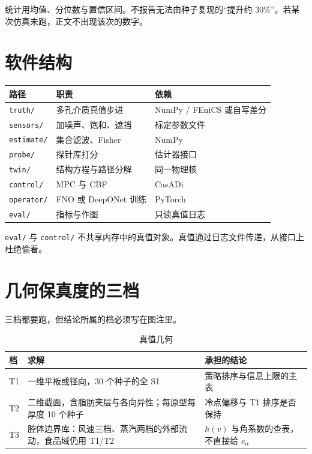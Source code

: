 统计用均值、分位数与置信区间。不报告无法由种子复现的“提升约 30\%”。若某次仿真未跑，正文不出现该次的数字。

\section{软件结构}

\begin{center}
\begin{tabularx}{\textwidth}{llX}
\toprule
路径 & 职责 & 依赖 \\
\midrule
\texttt{truth/} & 多孔介质真值步进 & NumPy / FEniCS 或自写差分 \\
\texttt{sensors/} & 加噪声、饱和、遮挡 & 标定参数文件 \\
\texttt{estimate/} & 集合滤波、Fisher & NumPy \\
\texttt{probe/} & 探针库打分 & 估计器接口 \\
\texttt{twin/} & 结构方程与路径分解 & 同一物理核 \\
\texttt{control/} & MPC 与 CBF & CasADi \\
\texttt{operator/} & FNO 或 DeepONet 训练 & PyTorch \\
\texttt{eval/} & 指标与作图 & 只读真值日志 \\
\bottomrule
\end{tabularx}
\end{center}

\texttt{eval/} 与 \texttt{control/} 不共享内存中的真值对象。真值通过日志文件传递，从接口上杜绝偷看。

\section{几何保真度的三档}

三档都要跑，但结论所属的档必须写在图注里。

\begin{table}[H]
\centering
\caption{真值几何}
\begin{tabularx}{\textwidth}{llX}
\toprule
档 & 求解 & 承担的结论 \\
\midrule
T1 & 一维平板或径向，30 个种子的全 S1 & 策略排序与信息上限的主表 \\
T2 & 二维截面，含脂肪夹层与各向异性；每原型每厚度 10 个种子 & 冷点偏移与 T1 排序是否保持 \\
T3 & 腔体边界库：风速三档、蒸汽两档的外部流动，食品域仍用 T1/T2 & $h(v)$ 与角系数的查表，不直接给 $e_{\alpha}$ \\
\bottomrule
\end{tabularx}
\end{table}

